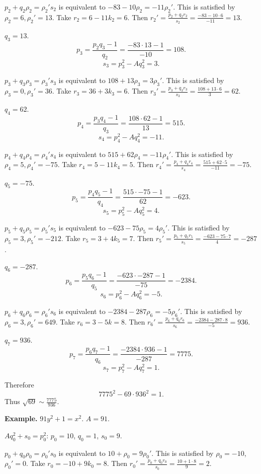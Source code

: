 \documentclass{article}
\theoremstyle{definition}
\begin{document}
$p_2+q_2\rho_2=\rho_2's_2$ is equivalent to
$-83 -10\rho_2 = -11\rho_2'$. This is satisfied by
$\rho_2=6, \rho_2'=13$. 
Take $r_2=6-11k_2 = 6$.
Then
$r_2'=\frac{p_2+q_2r_2}{s_2}=\frac{-83-10\cdot 6}{-11}=13$.

$q_3=13$. 
\[
p_3 = \frac{p_2q_3-1}{q_2} = \frac{-83 \cdot 13 - 1}{-10} = 108.
\]
\[
s_3 = p_3^2-Aq_3^2 = 3.
\]

$p_3+q_3\rho_3=\rho_3's_3$ is equivalent to
$108+13\rho_3=3\rho_3'$. This is satisfied by 
$\rho_3=0, \rho_3'=36$.
Take $r_3=36+3k_3=6$. 
Then $r_3'=\frac{p_3+q_3r_3}{s_3} = \frac{108+13\cdot 6}{3} = 62$.

$q_4=62$.
\[
p_4 = \frac{p_3q_4-1}{q_3} = \frac{108 \cdot 62 - 1}{13} = 515.
\]
\[
s_4 = p_4^2-Aq_4^2 = -11.
\]

$p_4+q_4\rho_4=\rho_4's_4$ is equivalent to
$515 + 62\rho_4 = -11\rho_4'$.
This is satisfied by
$\rho_4= 5, \rho_4'=-75$. 
Take $r_4 = 5  - 11k_4= 5$. 
Then $r_4' = \frac{p_4+q_4r_4}{s_4} = \frac{515 + 62 \cdot 5}{-11} = -75$.

$q_5=-75$.
\[
p_5 = \frac{p_4q_5-1}{q_4} = \frac{515\cdot -75 - 1}{62} = -623.
\]
\[
s_5 = p_5^2-Aq_5^2 = 4.
\]

$p_5+q_5\rho_5=\rho_5's_5$ is equivalent to
$-623 -75\rho_5 = 4\rho_5'$.
This is satisfied by $\rho_5=3, \rho_5'=-212$. 
Take $r_5 = 3 + 4k_5 = 7$.
Then $r_5' = \frac{p_5+q_5r_5}{s_5} = \frac{-623 - 75 \cdot 7}{4}
=-287$. 

$q_6=-287$.
\[
p_6 = \frac{p_5q_6-1}{q_5} = \frac{-623 \cdot -287-1}{-75} = -2384.
\]
\[
s_6 = p_6^2-Aq_6^2 = -5.
\]

$p_6+q_6\rho_6=\rho_6's_6$ is equivalent to
$-2384 -287 \rho_6 = -5\rho_6'$. 
This is satisfied by $\rho_6=3, \rho_6'=649$.
Take $r_6 = 3 - 5k=8$.
Then $r_6' = \frac{p_6+q_6r_6}{s_6}
=\frac{-2384 - 287 \cdot 8}{-5} = 936$.

$q_7 = 936$.
\[
p_7 = \frac{p_6q_7-1}{q_6} = \frac{-2384 \cdot 936-1}{-287} = 7775.
\]
\[
s_7 = p_7^2-Aq_7^2 =  1.
\]

Therefore
\[
7775^2 - 69 \cdot 936^2 = 1.
\]
Thus $\sqrt{69} \sim \frac{7775}{936}$. 




\textbf{Example.} $91y^2+1=x^2$. 
$A=91$.

$Aq_0^2+s_0=p_0^2$:
$p_0=10$, $q_0=1$, $s_0=9$. 

$p_0+q_0\rho_0 = \rho_0's_0$ is equivalent to
$10 +\rho_0=9\rho_0'$. This is satisfied by
$\rho_0=-10$, $\rho_0'=0$.
Take $r_0 = -10 + 9k_0 = 8$. 
Then $r_0'= \frac{p_0+q_0r_0}{s_0}=
\frac{10+1 \cdot 8}{9} = 2$.
\end{document}
